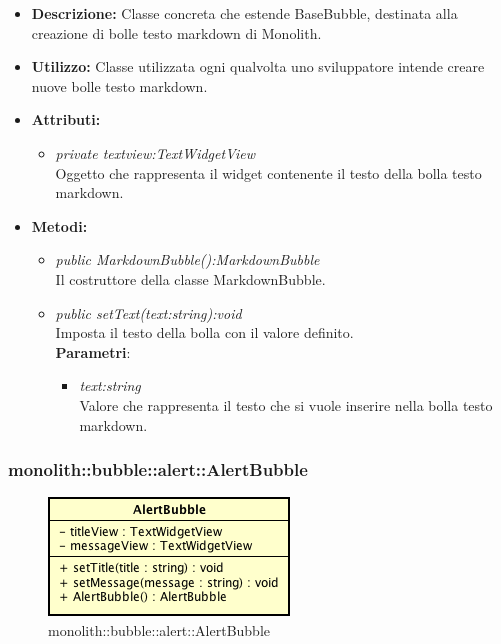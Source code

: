 \begin{itemize}
\item \textbf{Descrizione:} Classe concreta che estende BaseBubble, destinata alla creazione di bolle testo markdown di Monolith.
\item \textbf{Utilizzo:} Classe utilizzata ogni qualvolta uno sviluppatore intende creare nuove bolle testo markdown.
\item \textbf{Attributi:}
\begin{itemize}
\item \textit{private textview:TextWidgetView}\\
Oggetto che rappresenta il widget contenente il testo della bolla testo markdown.
\end{itemize}
\item \textbf{Metodi:}
\begin{itemize}
\item \textit{public MarkdownBubble():MarkdownBubble}\\
Il costruttore della classe MarkdownBubble.
\item \textit{public setText(text:string):void}\\
Imposta il testo della bolla con il valore definito.
\\ \textbf{Parametri}: \begin{itemize}
\item \textit{text:string}\\
Valore che rappresenta il testo che si vuole inserire nella bolla testo markdown.
\end{itemize}
\end{itemize}
\end{itemize}

\subsubsection{monolith::bubble::alert::AlertBubble}

\label{monolith::bubble::alert::AlertBubble}
\begin{figure}[H]
	\centering
	\includegraphics[scale=0.5]{Sezioni/SottosezioniST/img/AlertBubble.png}
	\caption{monolith::bubble::alert::AlertBubble}
\end{figure}


